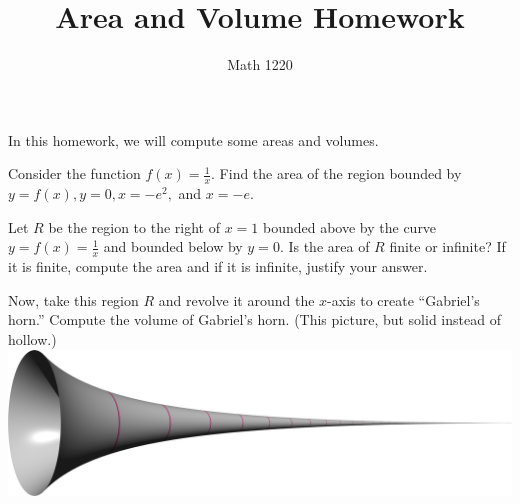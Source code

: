 \documentclass[12pt, a4paper]{article}
\author{Math 1220}
\title{Area and Volume Homework}
\date{}
\begin{document}
\maketitle
\nameline
In this homework, we will compute some areas and volumes.
\begin{ex}
  Consider the function \(f(x) = \frac{1}{x}\). Find the area of the
  region bounded by \(y = f(x), y=0, x=-e^2,\) and \(x=-e\).
\end{ex}
\begin{ex}
  Let \(R\) be the region to the right of \(x=1\) bounded above by
  the curve \(y = f(x) = 
  \frac{1}{x}\) and bounded below by \(y=0\). Is the area of \(R\)
  finite or infinite? If
  it is finite, compute the area and if it is infinite, justify your answer.
\end{ex}
\pagebreak
\begin{ex}
  Now, take this region \(R\) and revolve it around the \(x\)-axis to
  create ``Gabriel's horn.'' Compute the volume of Gabriel's
  horn. (This picture, but solid instead of hollow.)\\
  
  \includegraphics[scale=0.2]{images/GabrielHorn}
\end{ex}

\end{document}
